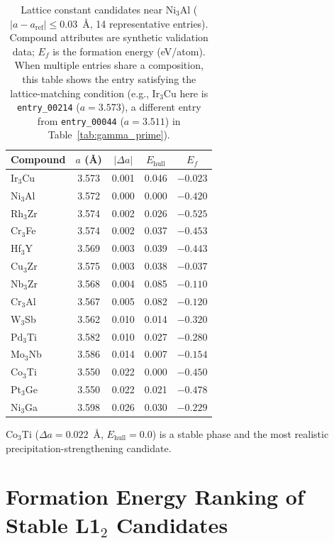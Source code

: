 \begin{table}[htbp]
  \centering
  \caption{Lattice constant candidates near Ni$_3$Al ($|a - a_{\text{ref}}| \leq 0.03$~\AA{}{}, 14 representative entries). Compound attributes are synthetic validation data; $E_f$ is the formation energy (eV/atom). When multiple entries share a composition, this table shows the entry satisfying the lattice-matching condition (e.g., Ir$_3$Cu here is \texttt{entry\_00214} ($a=3.573$), a different entry from \texttt{entry\_00044} ($a=3.511$) in Table~\ref{tab:gamma_prime}).}
  \label{tab:sup_lattice_match}
  \small
  \begin{tabular}{lcccc}
    \toprule
    Compound & $a$ (\AA{}{}) & $|\Delta a|$ & $E_\text{hull}$ & $E_f$ \\
    \midrule
    Ir$_3$Cu & 3.573 & 0.001 & 0.046 & $-0.023$ \\
    Ni$_3$Al & 3.572 & 0.000 & 0.000 & $-0.420$ \\
    Rh$_3$Zr & 3.574 & 0.002 & 0.026 & $-0.525$ \\
    Cr$_3$Fe & 3.574 & 0.002 & 0.037 & $-0.453$ \\
    Hf$_3$Y & 3.569 & 0.003 & 0.039 & $-0.443$ \\
    Cu$_3$Zr & 3.575 & 0.003 & 0.038 & $-0.037$ \\
    Nb$_3$Zr & 3.568 & 0.004 & 0.085 & $-0.110$ \\
    Cr$_3$Al & 3.567 & 0.005 & 0.082 & $-0.120$ \\
    W$_3$Sb & 3.562 & 0.010 & 0.014 & $-0.320$ \\
    Pd$_3$Ti & 3.582 & 0.010 & 0.027 & $-0.280$ \\
    Mo$_3$Nb & 3.586 & 0.014 & 0.007 & $-0.154$ \\
    Co$_3$Ti & 3.550 & 0.022 & 0.000 & $-0.450$ \\
    Pt$_3$Ge & 3.550 & 0.022 & 0.021 & $-0.478$ \\
    Ni$_3$Ga & 3.598 & 0.026 & 0.030 & $-0.229$ \\
    \bottomrule
  \end{tabular}
\end{table}


Co$_3$Ti ($\Delta a = 0.022$~\AA{}{}, $E_\text{hull} = 0.0$) is a stable phase and the most realistic precipitation-strengthening candidate.


\section{Formation Energy Ranking of Stable L1$_2$ Candidates}

